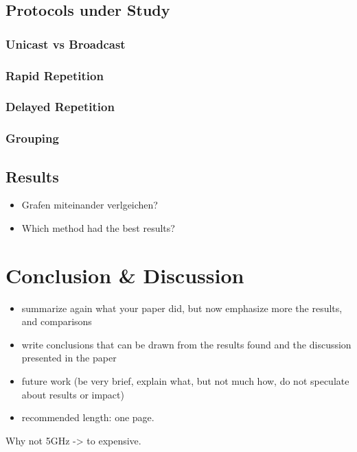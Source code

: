 \documentclass[]{ccs-thesis}
\begin{document}
\section{Protocols under Study}
\subsection*{Unicast vs Broadcast}
\subsection*{Rapid Repetition}
\subsection*{Delayed Repetition}
\subsection*{Grouping}

\section{Results}
\begin{itemize}
	\item Grafen miteinander verlgeichen?
	\item Which method had the best results?
\end{itemize}

\chapter{Conclusion \& Discussion}
\begin{itemize}
\item summarize again what your paper did, but now emphasize more the results, and comparisons
\item write conclusions that can be drawn from the results found and the discussion presented in the paper
\item future work (be very brief, explain what, but not much how, do not speculate about results or impact)
\item recommended length: one page.
\end{itemize}

Why not 5GHz -> to expensive.\\
\end{document}
